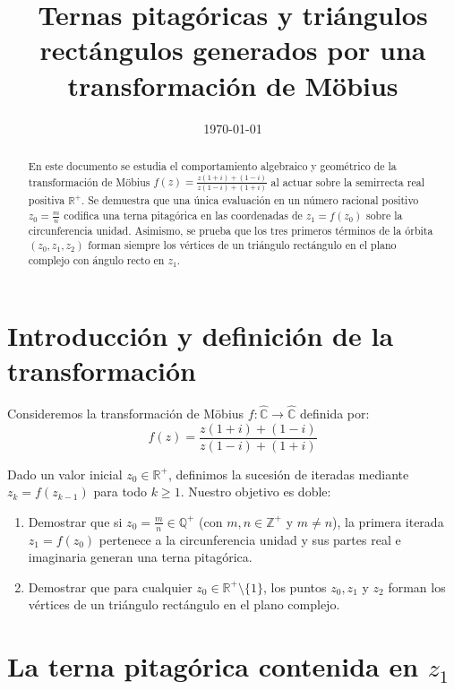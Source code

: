 \documentclass[11pt,a4paper]{article}
\title{\textbf{Ternas pitagóricas y triángulos rectángulos generados por una transformación de Möbius}}
\author{}
\date{\today}
\theoremstyle{plain}
\theoremstyle{definition}
\begin{document}
\maketitle

\begin{abstract}
En este documento se estudia el comportamiento algebraico y geométrico de la transformación de Möbius $f(z) = \frac{z(1+i) + (1-i)}{z(1-i) + (1+i)}$ al actuar sobre la semirrecta real positiva $\mathbb{R}^+$. Se demuestra que una única evaluación en un número racional positivo $z_0 = \frac{m}{n}$ codifica una terna pitagórica en las coordenadas de $z_1 = f(z_0)$ sobre la circunferencia unidad. Asimismo, se prueba que los tres primeros términos de la órbita $(z_0, z_1, z_2)$ forman siempre los vértices de un triángulo rectángulo en el plano complejo con ángulo recto en $z_1$.
\end{abstract}

\section{Introducción y definición de la transformación}

Consideremos la transformación de Möbius $f: \widehat{\mathbb{C}} \to \widehat{\mathbb{C}}$ definida por:
\begin{equation}\label{eq:mobius}
f(z) = \frac{z(1 + i) + (1 - i)}{z(1 - i) + (1 + i)}
\end{equation}

Dado un valor inicial $z_0 \in \mathbb{R}^+$, definimos la sucesión de iteradas mediante $z_{k} = f(z_{k-1})$ para todo $k \ge 1$. Nuestro objetivo es doble:
\begin{enumerate}
    \item Demostrar que si $z_0 = \frac{m}{n} \in \mathbb{Q}^+$ (con $m, n \in \mathbb{Z}^+$ y $m \neq n$), la primera iterada $z_1 = f(z_0)$ pertenece a la circunferencia unidad y sus partes real e imaginaria generan una terna pitagórica.
    \item Demostrar que para cualquier $z_0 \in \mathbb{R}^+ \setminus \{1\}$, los puntos $z_0, z_1$ y $z_2$ forman los vértices de un triángulo rectángulo en el plano complejo.
\end{enumerate}

\section{La terna pitagórica contenida en \texorpdfstring{$z_1$}{z1}}
\end{document}

